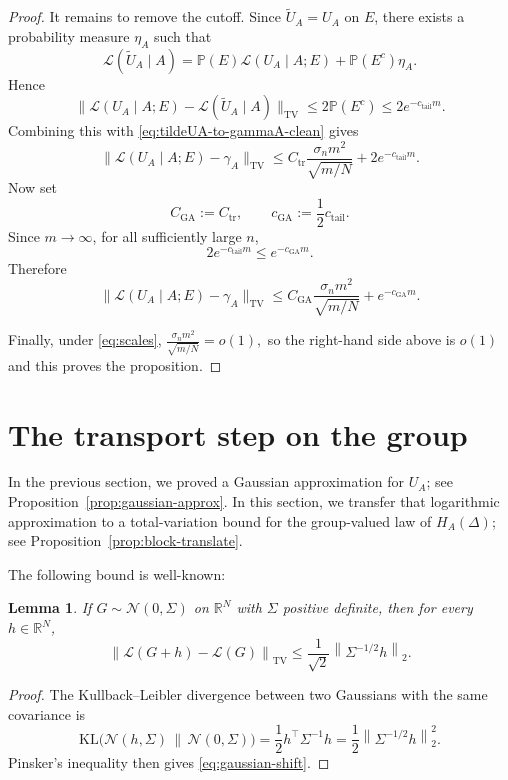 \documentclass[11pt, reqno]{amsart}
\numberwithin{equation}{section}
\newtheorem{lemma}{Lemma}
\theoremstyle{remark}
\newcommand{\R}{\mathbb{R}}
\newcommand{\Prob}{\mathbb{P}}
\newcommand{\1}{\mathbf{1}}
\newcommand{\Law}{\mathcal{L}}
\newcommand{\TV}{\mathrm{TV}}
\newcommand{\KL}{\mathrm{KL}}
\newcommand{\norm}[1]{\left\lVert #1\right\rVert}
\begin{document}
\begin{proof}
It remains to remove the cutoff. Since $\widetilde U_A=U_A$ on $E$,
there exists a probability measure $\eta_A$ such that
\[
\Law(\widetilde U_A\mid A)
=
\Prob(E)\Law(U_A\mid A;E)+\Prob(E^c)\eta_A.
\]
Hence
\[
\|\Law(U_A\mid A;E)-\Law(\widetilde U_A\mid A)\|_{\TV}
\le
2\Prob(E^c)
\le
2e^{-c_{\mathrm{tail}}m}.
\]
Combining this with \eqref{eq:tildeUA-to-gammaA-clean} gives
\[
\|\Law(U_A\mid A;E)-\gamma_A\|_{\TV}
\le
C_{\mathrm{tr}}\frac{\sigma_n m^2}{\sqrt{m/N}}
+
2e^{-c_{\mathrm{tail}}m}.
\]
Now set
\[
C_{\mathrm{GA}}:=C_{\mathrm{tr}},
\qquad
c_{\mathrm{GA}}:=\frac12 c_{\mathrm{tail}}.
\]
Since \(m\to\infty\), for all sufficiently large \(n\),
\[
2e^{-c_{\mathrm{tail}}m}\le e^{-c_{\mathrm{GA}}m}.
\]
Therefore
\[
\|\Law(U_A\mid A;E)-\gamma_A\|_{\TV}
\le
C_{\mathrm{GA}}\frac{\sigma_n m^2}{\sqrt{m/N}}
+
e^{-c_{\mathrm{GA}}m}.
\]

Finally, under \eqref{eq:scales},
$
\frac{\sigma_n m^2}{\sqrt{m/N}}=o(1),
$
so the right-hand side above is $o(1)$ and this proves the proposition.
\end{proof}

\section{The transport step on the group}
\label{sec:group-transport}

In the previous section, we proved a Gaussian approximation for $U_A$; see Proposition~\ref{prop:gaussian-approx}. In this section, we transfer that logarithmic approximation to a total-variation bound for the group-valued law of $H_A(\Delta)$; see Proposition~\ref{prop:block-translate}.

\noindent
The following bound is well-known:
\begin{lemma}
\label{lem:gaussian-shift}
If $G\sim \mathcal N(0,\Sigma)$ on $\R^N$ with $\Sigma$ positive definite, then for every
$h\in\R^N$,
\begin{equation}
\label{eq:gaussian-shift}
\norm{\Law(G+h)-\Law(G)}_{\TV}
\le
\frac{1}{\sqrt{2}}\norm{\Sigma^{-1/2}h}_2.
\end{equation}
\end{lemma}

\begin{proof}
The Kullback--Leibler divergence between two Gaussians with the same covariance is
\[
\KL\!\bigl(\mathcal N(h,\Sigma)\,\|\,\mathcal N(0,\Sigma)\bigr)
=
\frac12 h^\top \Sigma^{-1}h
=
\frac12 \norm{\Sigma^{-1/2}h}_2^2.
\]
Pinsker's inequality then gives \eqref{eq:gaussian-shift}.
\end{proof}
\end{document}
